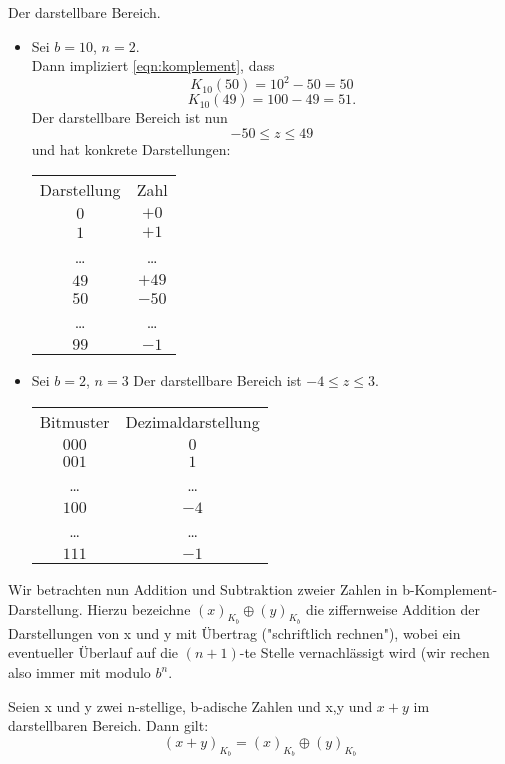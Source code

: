 \begin{example} Der darstellbare Bereich.
\begin{itemize}
	\item Sei $b = 10$, $n=2$. \\ 
Dann impliziert \eqref{eqn:komplement}, dass
\[
K_{10}(50)= 10^2-50=50
\]
\[
K_{10}(49)= 100 -49=51 \text{.}
\]
Der darstellbare Bereich ist nun 
\[
-50 \le z \le 49
\]
und hat konkrete Darstellungen:

\begin{center}
\begin{tabular}{ c c }
 Darstellung & Zahl   \\
 $0$ & $+0$  \\
 $1$ & $+1$ \\
 \ldots & \ldots \\
 $49$ & $+49$ \\
 $50$ & $-50$ \\
 \ldots & \ldots \\
 $99$ & $-1$
\end{tabular}
\end{center}

\item Sei $b=2$, $n=3$ Der darstellbare Bereich ist $-4 \le  z \le 3$. \\
\begin{center}
\begin{tabular}{ c c }
 Bitmuster & Dezimaldarstellung  \\ 
 $000$ & $0$   \\  
 $001$ & $1$  \\
 \ldots & \ldots \\
 $100$ & $-4$ \\
 \ldots & \ldots \\
 $111$ & $-1$
\end{tabular}
\end{center}
\end{itemize}
\end{example}%
Wir betrachten nun Addition und Subtraktion zweier Zahlen in b-Komplement-Darstellung. 
Hierzu bezeichne $(x)_{K_b} \oplus (y)_{K_b}$ die ziffernweise Addition der Darstellungen von x und y mit Übertrag ("schriftlich rechnen"), 
wobei ein eventueller Überlauf auf die $(n+1)$-te Stelle vernachlässigt wird (wir rechen also immer mit modulo $b^{n}$.
\begin{theorem}
	Seien x und y zwei n-stellige, b-adische Zahlen und x,y und $x+y$ im darstellbaren Bereich.
Dann gilt:
\[
(x+y)_{K_b} = (x)_{K_b} \oplus (y)_{K_b}
\]
\end{theorem}
